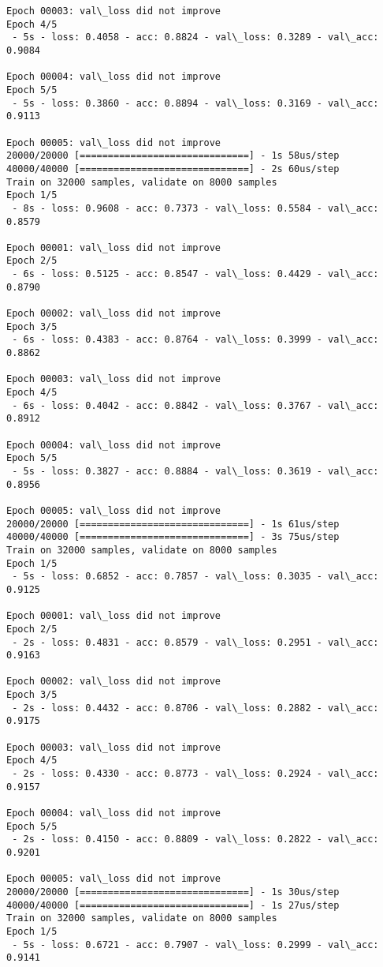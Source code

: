 \documentclass[11pt]{article}
\begin{document}
\begin{Verbatim}[commandchars=\\\{\}]
Epoch 00003: val\_loss did not improve
Epoch 4/5
 - 5s - loss: 0.4058 - acc: 0.8824 - val\_loss: 0.3289 - val\_acc: 0.9084

Epoch 00004: val\_loss did not improve
Epoch 5/5
 - 5s - loss: 0.3860 - acc: 0.8894 - val\_loss: 0.3169 - val\_acc: 0.9113

Epoch 00005: val\_loss did not improve
20000/20000 [==============================] - 1s 58us/step
40000/40000 [==============================] - 2s 60us/step
Train on 32000 samples, validate on 8000 samples
Epoch 1/5
 - 8s - loss: 0.9608 - acc: 0.7373 - val\_loss: 0.5584 - val\_acc: 0.8579

Epoch 00001: val\_loss did not improve
Epoch 2/5
 - 6s - loss: 0.5125 - acc: 0.8547 - val\_loss: 0.4429 - val\_acc: 0.8790

Epoch 00002: val\_loss did not improve
Epoch 3/5
 - 6s - loss: 0.4383 - acc: 0.8764 - val\_loss: 0.3999 - val\_acc: 0.8862

Epoch 00003: val\_loss did not improve
Epoch 4/5
 - 6s - loss: 0.4042 - acc: 0.8842 - val\_loss: 0.3767 - val\_acc: 0.8912

Epoch 00004: val\_loss did not improve
Epoch 5/5
 - 5s - loss: 0.3827 - acc: 0.8884 - val\_loss: 0.3619 - val\_acc: 0.8956

Epoch 00005: val\_loss did not improve
20000/20000 [==============================] - 1s 61us/step
40000/40000 [==============================] - 3s 75us/step
Train on 32000 samples, validate on 8000 samples
Epoch 1/5
 - 5s - loss: 0.6852 - acc: 0.7857 - val\_loss: 0.3035 - val\_acc: 0.9125

Epoch 00001: val\_loss did not improve
Epoch 2/5
 - 2s - loss: 0.4831 - acc: 0.8579 - val\_loss: 0.2951 - val\_acc: 0.9163

Epoch 00002: val\_loss did not improve
Epoch 3/5
 - 2s - loss: 0.4432 - acc: 0.8706 - val\_loss: 0.2882 - val\_acc: 0.9175

Epoch 00003: val\_loss did not improve
Epoch 4/5
 - 2s - loss: 0.4330 - acc: 0.8773 - val\_loss: 0.2924 - val\_acc: 0.9157

Epoch 00004: val\_loss did not improve
Epoch 5/5
 - 2s - loss: 0.4150 - acc: 0.8809 - val\_loss: 0.2822 - val\_acc: 0.9201

Epoch 00005: val\_loss did not improve
20000/20000 [==============================] - 1s 30us/step
40000/40000 [==============================] - 1s 27us/step
Train on 32000 samples, validate on 8000 samples
Epoch 1/5
 - 5s - loss: 0.6721 - acc: 0.7907 - val\_loss: 0.2999 - val\_acc: 0.9141


\end{Verbatim}
\end{document}
